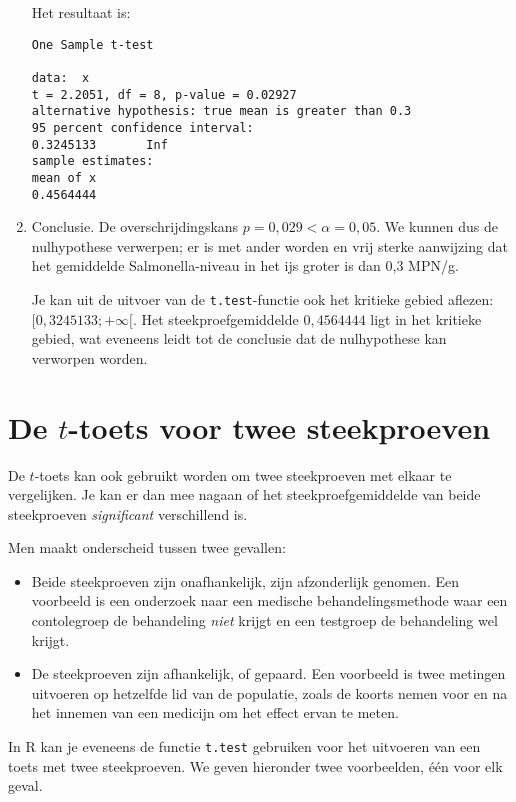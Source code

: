 \begin{example}
\begin{enumerate}
    Het resultaat is:
    
\begin{verbatim}
One Sample t-test

data:  x
t = 2.2051, df = 8, p-value = 0.02927
alternative hypothesis: true mean is greater than 0.3
95 percent confidence interval:
0.3245133       Inf
sample estimates:
mean of x 
0.4564444 
\end{verbatim}
    
    \item Conclusie. De overschrijdingskans $p = 0,029 < \alpha = 0,05$. We kunnen dus de nulhypothese verwerpen; er is met ander worden en vrij sterke aanwijzing dat het gemiddelde Salmonella-niveau in het ijs groter is dan 0,3 MPN/g.
    
    Je kan uit de uitvoer van de \texttt{t.test}-functie ook het kritieke gebied aflezen: $[0,3245133; +\infty[$. Het steekproefgemiddelde $0,4564444$ ligt in het kritieke gebied, wat eveneens leidt tot de conclusie dat de nulhypothese kan verworpen worden.
  \end{enumerate}
\end{example}

\section{De \texorpdfstring{$t$}{t}-toets voor twee steekproeven}
\label{sec:t-toets-twee-steekproeven}

De $t$-toets kan ook gebruikt worden om twee steekproeven met elkaar te vergelijken. Je kan er dan mee nagaan of het steekproefgemiddelde van beide steekproeven \emph{significant} verschillend is.

Men maakt onderscheid tussen twee gevallen:

\begin{itemize}
  \item Beide steekproeven zijn onafhankelijk, zijn afzonderlijk genomen. Een voorbeeld is een onderzoek naar een medische behandelingsmethode waar een contolegroep de behandeling \emph{niet} krijgt en een testgroep de behandeling wel krijgt.
  \item De steekproeven zijn afhankelijk, of gepaard. Een voorbeeld is twee metingen uitvoeren op hetzelfde lid van de populatie, zoals de koorts nemen voor en na het innemen van een medicijn om het effect ervan te meten.
\end{itemize}

In R kan je eveneens de functie \texttt{t.test} gebruiken voor het uitvoeren van een toets met twee steekproeven. We geven hieronder twee voorbeelden, één voor elk geval.

